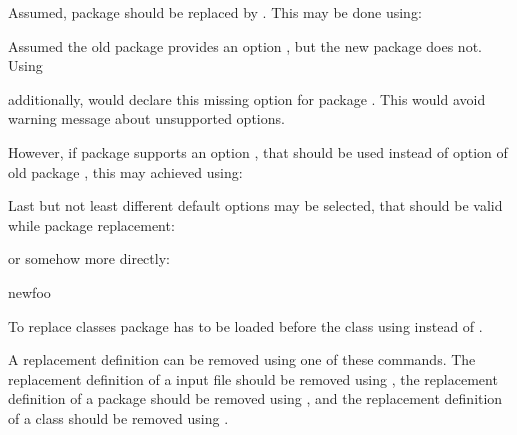 \begin{Example}
  Assumed, package  should be replaced by
  . This may be done using:
\begin{lstcode}
\end{lstcode}
  Assumed the old package provides an option , but the new
  package does not. Using
\begin{lstcode}
\end{lstcode}
  additionally, would declare this missing option for package
  . This would avoid warning message about unsupported
  options.

  However, if package  supports an option ,
  that should be used instead of option  of old package
  , this may achieved using:
\begin{lstcode}
\end{lstcode}
  Last but not least different default options may be selected, that should be
  valid while package replacement:
\begin{lstcode}
\end{lstcode}
  or somehow more directly:
\begin{lstcode}
                       {newfoo}%
\end{lstcode}
\end{Example}

To replace classes package  has to be loaded before the
class using  instead of .
%
\EndIndexGroup


\begin{Declaration}
\end{Declaration}
A replacement definition can be removed
using one of these commands. The replacement definition of a input file should
be removed using , the replacement definition of a
package should be removed using , and the replacement
definition of a class should be removed using .%
\EndIndexGroup


